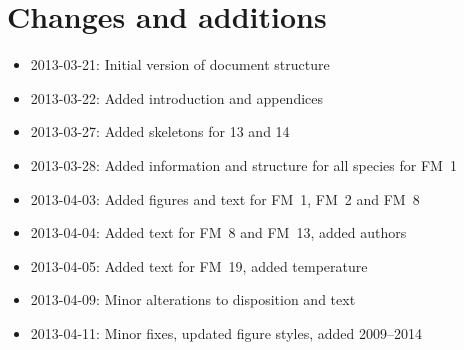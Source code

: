 \chapter{Changes and additions}
\label{ch:changes}

\begin{itemize}
    \item 2013-03-21: Initial version of document structure
    \item 2013-03-22: Added introduction and appendices
    \item 2013-03-27: Added skeletons for 13 and 14
    \item 2013-03-28: Added information and structure for all species for FM~1
    \item 2013-04-03: Added figures and text for FM~1, FM~2 and FM~8
    \item 2013-04-04: Added text for FM~8 and FM~13, added authors
    \item 2013-04-05: Added text for FM~19, added temperature
    \item 2013-04-09: Minor alterations to disposition and text
    \item 2013-04-11: Minor fixes, updated figure styles, added 2009--2014
\end{itemize}

